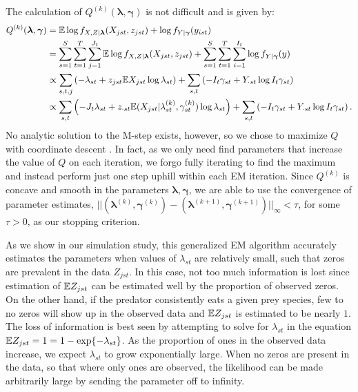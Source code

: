 The calculation of $Q^{(k)}(\boldsymbol{\lambda}, \boldsymbol{\gamma})$ is not difficult and is given by:
\begin{align}
  \label{eq:estep}
  \begin{split}
  Q^{(k)}(\boldsymbol{\lambda}, \boldsymbol{\gamma})
  & = \mathbb{E} \log{f_{X,Z|\boldsymbol{\lambda}}(X_{jst},z_{jst})} + \log{f_{Y|\boldsymbol{\gamma}}(y_{ist})} \\
  & = \sum_{s=1}^S \sum_{t=1}^T \sum_{j=1}^{J_t} \mathbb{E} \log{f_{X,Z|\boldsymbol{\lambda}}(X_{jst},z_{jst})}
  + \sum_{s=1}^S \sum_{t=1}^T \sum_{i=1}^{I_t} \log{f_{Y|\boldsymbol{\gamma}}(y)} \\
  & \propto \sum_{s,t,j} \left( - \lambda_{st} 
    + z_{jst} \mathbb{E} X_{jst} \log{\lambda_{st}}  \right) + \sum_{s,t} \left( -I_t \gamma_{st} + Y_{\cdot st} \log{I_t \gamma_{st}} \right) \\
  & \propto \sum_{s,t} \left( -J_t \lambda_{st} + z_{\cdot st} \mathbb{E} (X_{jst}|\lambda_{st}^{(k)},\gamma_{st}^{(k)}) \log{\lambda_{st}} \right) + \sum_{s,t} \left( -I_t \gamma_{st} + Y_{\cdot st} \log{I_t \gamma_{st}} \right).
\end{split}
\end{align}
\noindent No analytic solution to the M-step exists, however, so we chose to maximize $Q$ with coordinate descent \citep{Luo:1992}.  In fact, as we only need find parameters that increase the value of $Q$ on each iteration, we forgo fully iterating to find the maximum and instead perform just one step uphill within each EM iteration.  Since $Q^{(k)}$ is concave and smooth in the parameters $\boldsymbol{\lambda}, \boldsymbol{\gamma}$, we are able to use the convergence of parameter estimates, $||(\boldsymbol{\lambda}^{(k)}, \boldsymbol{\gamma}^{(k)}) - (\boldsymbol{\lambda}^{(k+1)}, \boldsymbol{\gamma}^{(k+1)})||_{\infty} < \tau $, for some $\tau>0$, as our stopping criterion.

As we show in our simulation study, this generalized EM algorithm accurately estimates the parameters when values of $\lambda_{st}$ are relatively small, such that zeros are prevalent in the data $Z_{jst}$.  In this case, not too much information is lost since estimation of $\mathbb{E} Z_{jst}$ can be estimated well by the proportion of observed zeros.  On the other hand, if the predator consistently eats a given prey species, few to no zeros will show up in the observed data and $\mathbb{E} Z_{jst}$ is estimated to be nearly $1$.  The loss of information is best seen by attempting to solve for $\lambda_{st}$ in the equation $\mathbb{E} Z_{jst} = 1 = 1 - \exp\{-\lambda_{st}\}$.  As the proportion of ones in the observed data increase, we expect $\lambda_{st}$ to grow exponentially large.  When no zeros are present in the data, so that where only ones are observed, the likelihood can be made arbitrarily large by sending the parameter off to infinity.  

